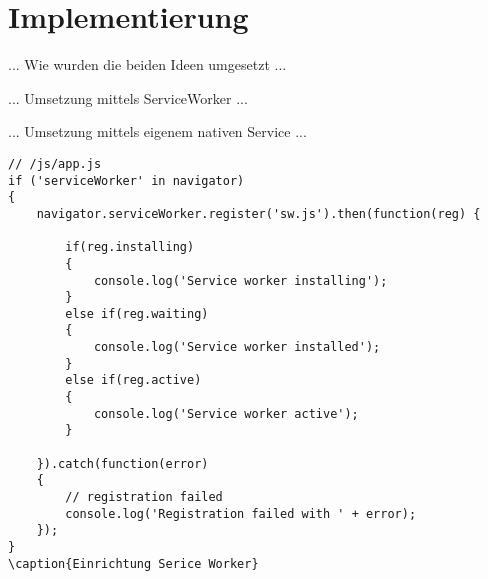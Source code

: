 \chapter{Implementierung}

... Wie wurden die beiden Ideen umgesetzt ...

... Umsetzung mittels ServiceWorker ...

... Umsetzung mittels eigenem nativen Service ...

\begin{lstlisting}
// /js/app.js
if ('serviceWorker' in navigator)
{
    navigator.serviceWorker.register('sw.js').then(function(reg) {

        if(reg.installing)
        {
            console.log('Service worker installing');
        } 
        else if(reg.waiting)
        {
            console.log('Service worker installed');
        } 
        else if(reg.active)
        {
            console.log('Service worker active');
        }

    }).catch(function(error)
    {
        // registration failed
        console.log('Registration failed with ' + error);
    });
}
\caption{Einrichtung Serice Worker}
\end{lstlisting}
